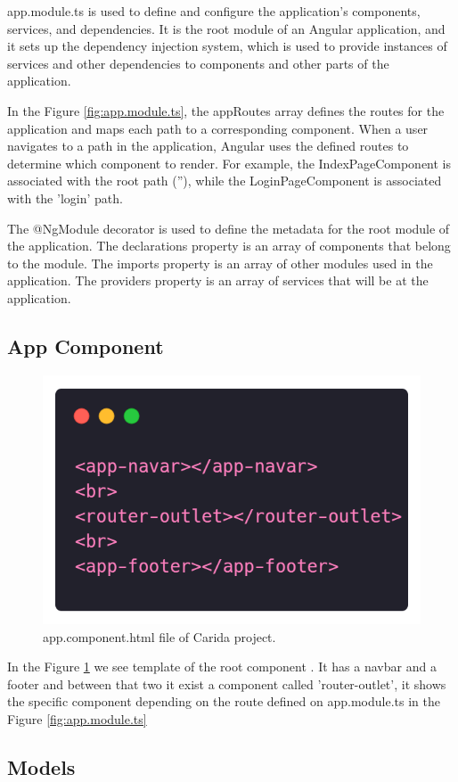 \documentclass{article}
\begin{document}
  app.module.ts \cite{caridaCode} is used to define and configure the application's components, services, and dependencies. It is the root module of an Angular application, and it sets up the dependency injection system, which is used to provide instances of services and other dependencies to components and other parts of the application.

  In the Figure \ref{fig:app.module.ts}, the appRoutes array defines the routes for the application and maps each path to a corresponding component. When a user navigates to a path in the application, Angular uses the defined routes to determine which component to render. For example, the IndexPageComponent is associated with the root path (''), while the LoginPageComponent is associated with the 'login' path. 
  
  The @NgModule decorator is used to define the metadata for the root module of the application. The declarations property is an array of components that belong to the module. The imports property is an array of other modules used in the application. The providers property is an array of services that will be at the application.

  \subsection*{App Component}
    \begin{figure}[h]
      \centering
      \includegraphics[width=0.5\columnwidth]{figures/app.component.html.png}
      \caption{app.component.html file of Carida project.\label{fig:app.component.html.png}}
      \end{figure}

      In the Figure \ref{fig:app.component.html.png} we see template of the root component \cite{caridaCode}. It has a navbar and a footer and between that two it exist a component called 'router-outlet', it shows the specific component depending on the route defined on app.module.ts in the Figure \ref{fig:app.module.ts}

  \subsection*{Models}
\end{document}
